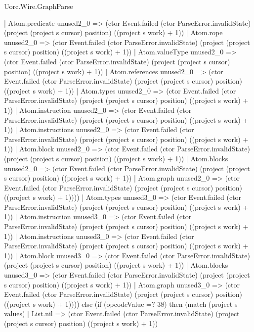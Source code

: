 \begin{lexlean}{Uorc.Wire.GraphParse}
\begin{semanticmodule}
{              | Atom.predicate unused2_0 => (ctor Event.failed (ctor ParseError.invalidState) (project (project s cursor) position) ((project s work) + 1))
              | Atom.rope unused2_0 => (ctor Event.failed (ctor ParseError.invalidState) (project (project s cursor) position) ((project s work) + 1))
              | Atom.valueType unused2_0 => (ctor Event.failed (ctor ParseError.invalidState) (project (project s cursor) position) ((project s work) + 1))
              | Atom.references unused2_0 => (ctor Event.failed (ctor ParseError.invalidState) (project (project s cursor) position) ((project s work) + 1))
              | Atom.types unused2_0 => (ctor Event.failed (ctor ParseError.invalidState) (project (project s cursor) position) ((project s work) + 1))
              | Atom.instruction unused2_0 => (ctor Event.failed (ctor ParseError.invalidState) (project (project s cursor) position) ((project s work) + 1))
              | Atom.instructions unused2_0 => (ctor Event.failed (ctor ParseError.invalidState) (project (project s cursor) position) ((project s work) + 1))
              | Atom.block unused2_0 => (ctor Event.failed (ctor ParseError.invalidState) (project (project s cursor) position) ((project s work) + 1))
              | Atom.blocks unused2_0 => (ctor Event.failed (ctor ParseError.invalidState) (project (project s cursor) position) ((project s work) + 1))
              | Atom.graph unused2_0 => (ctor Event.failed (ctor ParseError.invalidState) (project (project s cursor) position) ((project s work) + 1))))
          | Atom.types unused3_0 => (ctor Event.failed (ctor ParseError.invalidState) (project (project s cursor) position) ((project s work) + 1))
          | Atom.instruction unused3_0 => (ctor Event.failed (ctor ParseError.invalidState) (project (project s cursor) position) ((project s work) + 1))
          | Atom.instructions unused3_0 => (ctor Event.failed (ctor ParseError.invalidState) (project (project s cursor) position) ((project s work) + 1))
          | Atom.block unused3_0 => (ctor Event.failed (ctor ParseError.invalidState) (project (project s cursor) position) ((project s work) + 1))
          | Atom.blocks unused3_0 => (ctor Event.failed (ctor ParseError.invalidState) (project (project s cursor) position) ((project s work) + 1))
          | Atom.graph unused3_0 => (ctor Event.failed (ctor ParseError.invalidState) (project (project s cursor) position) ((project s work) + 1)))) else (if (opcodeValue =? 38) then (match (project s values)
        | List.nil => (ctor Event.failed (ctor ParseError.invalidState) (project (project s cursor) position) ((project s work) + 1))
}
\end{semanticmodule}
\end{lexlean}
